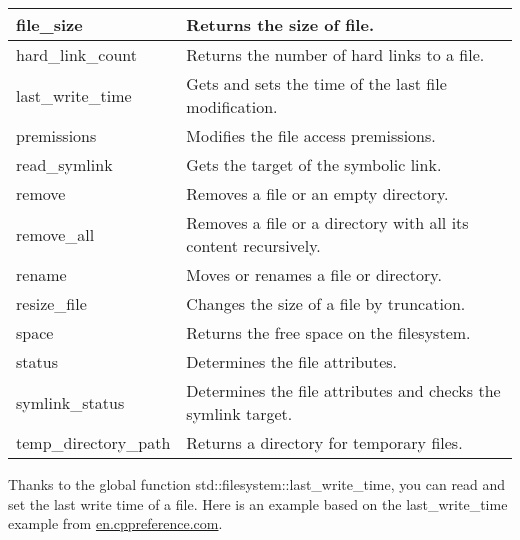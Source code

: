 \begin{longtable}[c]{|l|l|}
file\_size                                    & Returns the size of file.                                       \\ \hline
hard\_link\_count                             & Returns the number of hard links to a file.                     \\ \hline
last\_write\_time                             & Gets and sets the time of the last file modification.           \\ \hline
premissions                                   & Modifies the file access premissions.                           \\ \hline
read\_symlink                                 & Gets the target of the symbolic link.                           \\ \hline
remove                                        & Removes a file or an empty directory.                           \\ \hline
remove\_all                                   & Removes a file or a directory with all its content recursively. \\ \hline
rename                                        & Moves or renames a file or directory.                           \\ \hline
resize\_file                                  & Changes the size of a file by truncation.                       \\ \hline
space                                         & Returns the free space on the filesystem.                       \\ \hline
status                                        & Determines the file attributes.                                 \\ \hline
symlink\_status                               & Determines the file attributes and checks the symlink target.   \\ \hline
temp\_directory\_path                         & Returns a directory for temporary files.                        \\ \hline
\end{longtable}


Thanks to the global function std::filesystem::last\_write\_time, you can read and set the last write time of a file. Here is an example based on the last\_write\_time example from \href{http://en.cppreference.com/w/cpp/experimental/fs/last_write_time}{en.cppreference.com}.

